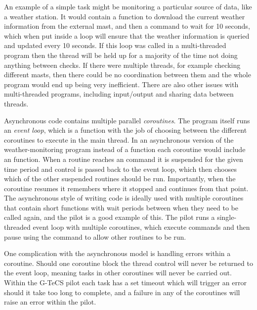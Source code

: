 \begin{colsection}
An example of a simple task might be monitoring a particular source of data, like a weather station. It would contain a function to download the current weather information from the external mast, and then a  command to wait for 10 seconds, which when put inside a loop will ensure that the weather information is queried and updated every 10 seconds. If this loop was called in a multi-threaded program then the thread will be held up for a majority of the time not doing anything between checks. If there were multiple threads, for example checking different masts, then there could be no coordination between them and the whole program would end up being very inefficient. There are also other issues with multi-threaded programs, including input/output and sharing data between threads.

Asynchronous code contains multiple parallel \textit{coroutines}. The program itself runs an \textit{event loop}, which is a function with the job of choosing between the different coroutines to execute in the main thread. In an asynchronous version of the weather-monitoring program instead of a  function each coroutine would include an  function. When a routine reaches an  command it is suspended for the given time period and control is passed back to the event loop, which then chooses which of the other suspended routines should be run. Importantly, when the coroutine resumes it remembers where it stopped and continues from that point. The asynchronous style of writing code is ideally used with multiple coroutines that contain short functions with wait periods between when they need to be called again, and the pilot is a good example of this. The pilot runs a single-threaded event loop with multiple coroutines, which execute commands and then pause using the  command to allow other routines to be run.

One complication with the asynchronous model is handling errors within a coroutine. Should one coroutine block the thread control will never be returned to the event loop, meaning tasks in other coroutines will never be carried out. Within the G-TeCS pilot each task has a set timeout which will trigger an error should it take too long to complete, and a failure in any of the coroutines will raise an error within the pilot.

\end{colsection}


